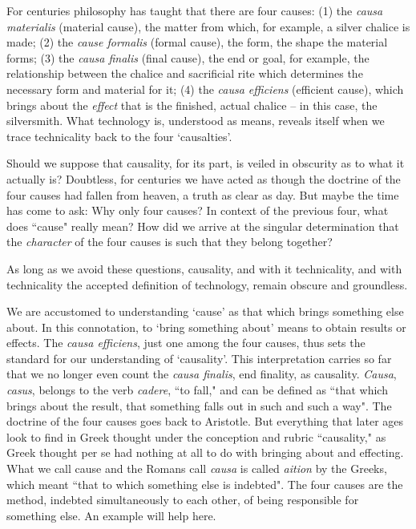 \documentclass[paper=a4, fontsize=11pt,twoside]{scrartcl}
\begin{document}
For centuries philosophy has taught that there are four causes: (1) the \textit{causa materialis} (material cause), the matter from which, for example, a silver chalice is made; (2) the \textit{cause formalis} (formal cause), the form, the shape the material forms; (3) the \textit{causa finalis} (final cause), the end or goal, for example, the relationship between the chalice and sacrificial rite which determines the necessary form and material for it; (4) the \textit{causa efficiens} (efficient cause), which brings about the \textit{effect} that is the finished, actual chalice -- in this case, the silversmith. What technology is, understood as means, reveals itself when we trace technicality back to the four `causalties'.

Should we suppose that causality, for its part, is veiled in obscurity as to what it actually is? Doubtless, for centuries we have acted as though the doctrine of the four causes had fallen from heaven, a truth as clear as day. But maybe the time has come to ask: Why only four causes? In context of the previous four, what does ``cause" really mean? How did we arrive at the singular determination that the \textit{character} of the four causes is such that they belong together?

As long as we avoid these questions, causality, and with it technicality, and with technicality the accepted definition of technology, remain obscure and groundless.

We are accustomed to understanding `cause' as that which brings something else about. In this connotation, to `bring something about' means to obtain results or effects. The \textit{causa efficiens}, just one among the four causes, thus sets the standard for our understanding of `causality'. This interpretation carries so far that we no longer even count the \textit{causa finalis}, end finality, as causality. \textit{Causa}, \textit{casus}, belongs to the verb \textit{cadere}, ``to fall," and can be defined as ``that which brings about the result, that something falls out in such and such a way". The doctrine of the four causes goes back to Aristotle. But everything that later ages look to find in Greek thought under the conception and rubric ``causality," as Greek thought per se had nothing at all to do with bringing about and effecting. What we call cause and the Romans call \textit{causa} is called \textit{aition} by the Greeks, which meant ``that to which something else is indebted". The four causes are the method, indebted simultaneously to each other, of being responsible for something else. An example will help here.
\end{document}
